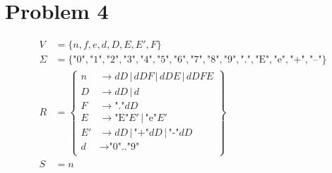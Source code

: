 \documentclass{article}
\begin{document}
\section*{Problem 4}
\begin{shaded}
  $$
  \begin{aligned}
      V &= \{n, f, e, d, D, E, E', F\} \\
      \Sigma &= \{\text{"0"}, \text{"1"}, \text{"2"}, \text{"3"}, \text{"4"}, \text{"5"}, \text{"6"}, \text{"7"}, \text{"8"}, \text{"9"}, \text{"."}, \text{"E"}, \text{"e"}, \text{"+"}, \text{"–"}\} \\
      R &= \left\{ 
      \begin{aligned}
        n  &\rightarrow dD \,|\, dDF \,|\, dDE \,|\, dDFE \\
        D  &\rightarrow dD \,|\, d \\
        F  &\rightarrow \text{"."}dD \\
        E  &\rightarrow \text{"E"}E' \,|\, \text{"e"}E' \\
        E' &\rightarrow dD \,|\, \text{"+"}dD \,|\, \text{"-"}dD \\
        d  &\rightarrow \text{"0".."9"} \\
      \end{aligned}
      \right\} \\
      S &= n
  \end{aligned}
  $$
\end{shaded}
\end{document}
